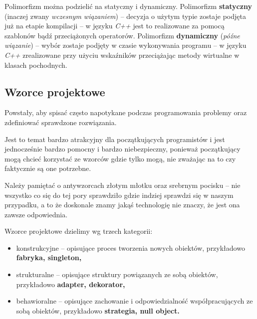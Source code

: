 Polimorfizm można podzielić na statyczny i dynamiczny. Polimorfizm \textbf{statyczny} (inaczej zwany \textit{wczesnym wiązaniem}) -- decyzja o użytym typie zostaje podjęta już na etapie kompilacji -- w języku \textit{C++} jest to realizowane za pomocą szablonów bądź przeciążonych operatorów.  Polimorfizm \textbf{dynamiczny} (\textit{późne wiązanie}) -- wybór zostaje podjęty w czasie wykonywania programu -- w języku \textit{C++} zrealizowane przy użyciu wskaźników przeciążając metody wirtualne w klasach pochodnych.

\subsection{Wzorce projektowe}
Powstały, aby spisać często napotykane podczas programowania problemy oraz zdefiniować sprawdzone rozwiązania.

Jest to temat bardzo atrakcyjny dla początkujących programistów i jest jednocześnie bardzo pomocny i bardzo niebezpieczny, ponieważ początkujący mogą chcieć korzystać ze wzorców gdzie tylko mogą, nie zważając na to czy faktycznie są one potrzebne.

Należy pamiętać o antywzorcach złotym młotku oraz srebrnym pocisku -- nie wszystko co się do tej pory sprawdziło gdzie indziej sprawdzi się w naszym przypadku, a to że doskonale znamy jakąś technologię nie znaczy, że jest ona zawsze odpowiednia.

Wzorce projektowe dzielimy wg trzech kategorii:
\begin{itemize}
	\item{konstrukcyjne -- opisujące proces tworzenia nowych obiektów, przykładowo \textbf{fabryka, singleton,}}
	\item{strukturalne -- opisujące struktury powiązanych ze sobą obiektów, przykładowo \textbf{adapter, dekorator,}}
	\item{behawioralne -- opisujące zachowanie i odpowiedzialność współpracujących ze sobą obiektów, przykładowo \textbf{strategia, null object.}}
\end{itemize}
